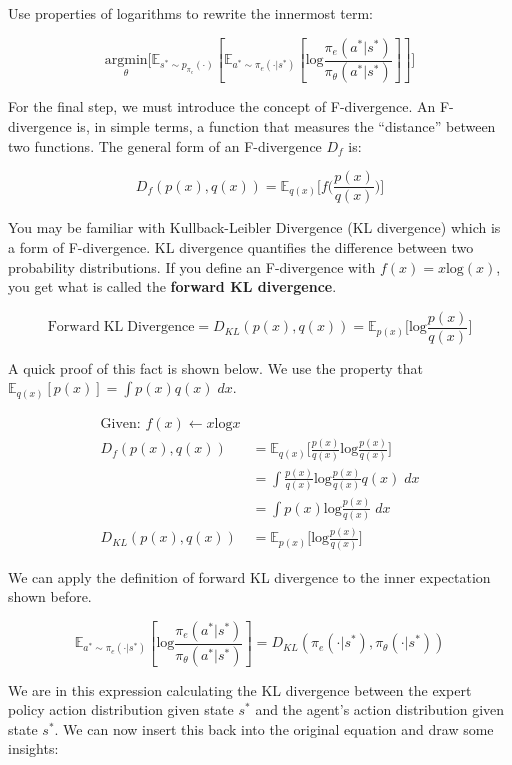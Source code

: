 \begin{flushleft}
    Use properties of logarithms to rewrite the innermost term:

    $$\underset{\theta}{\textrm{argmin}}\biggl[\mathbb{E}_{s^{*} \sim p_{\pi_e}(\cdot)}[\mathbb{E}_{a^{*} \sim \pi_e(\cdot|s^{*})}[\mathrm{log}\frac{\pi_e(a^{*}|s^{*})}{\pi_\theta(a^{*}|s^{*})}]]\biggr]$$

    For the final step, we must introduce the concept of F-divergence. An F-divergence is, in simple terms, a function that measures the ``distance'' between two functions. The general form of an F-divergence $D_f$ is:

    $$D_f(p(x),q(x)) = \mathbb{E}_{q(x)} \biggl[ f\biggl( \frac{p(x)}{q(x)}\biggr)\biggr]$$
    
    You may be familiar with Kullback-Leibler Divergence (KL divergence) which is a form of F-divergence. KL divergence quantifies the difference between two probability distributions. If you define an F-divergence with $f(x) = x\mathrm{log}(x)$, you get what is called the \textbf{forward KL divergence}.
    
    $$\mathrm{Forward\;KL\;Divergence} = D_{KL}(p(x),q(x)) = \mathbb{E}_{p(x)} \biggl[\mathrm{log}\frac{p(x)}{q(x)}\biggr]$$
    
    A quick proof of this fact is shown below. We use the property that $\mathbb{E}_{q(x)}[p(x)] = \int p(x)q(x)\;dx$.

    \begin{align*}
        \textrm{Given: }f(x) \leftarrow x\mathrm{log}x \\
        D_f(p(x),q(x))\ &= \mathbb{E}_{q(x)} \biggl[ \frac{p(x)}{q(x)}\mathrm{log}\frac{p(x)}{q(x)}\biggr]\\
        &= \int \frac{p(x)}{q(x)}\mathrm{log}\frac{p(x)}{q(x)}q(x)\;dx\\
        &= \int p(x)\mathrm{log}\frac{p(x)}{q(x)}\;dx\\
        D_{KL}(p(x),q(x)) &= \mathbb{E}_{p(x)} \biggl[\mathrm{log}\frac{p(x)}{q(x)}\biggr]
    \end{align*}

    We can apply the definition of forward KL divergence to the inner expectation shown before.

    $$\mathbb{E}_{a^{*} \sim \pi_e(\cdot|s^{*})}[\mathrm{log}\frac{\pi_e(a^{*}|s^{*})}{\pi_\theta(a^{*}|s^{*})}] = D_{KL}(\pi_e(\cdot|s^{*}),\pi_\theta(\cdot|s^{*}))$$

    We are in this expression calculating the KL divergence between the expert policy action distribution given state $s^{*}$ and the agent's action distribution given state $s^{*}$. We can now insert this back into the original equation and draw some insights:


\end{flushleft}
